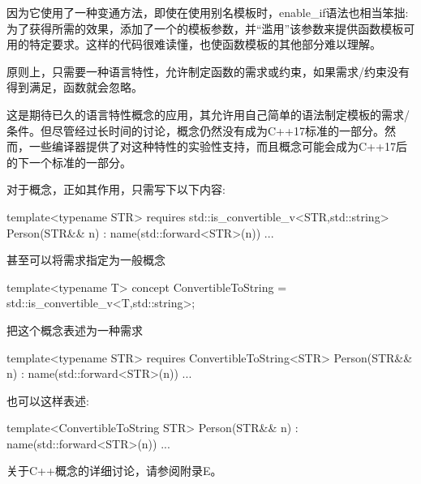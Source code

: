 因为它使用了一种变通方法，即使在使用别名模板时，enable\_if语法也相当笨拙:为了获得所需的效果，添加了一个的模板参数，并“滥用”该参数来提供函数模板可用的特定要求。这样的代码很难读懂，也使函数模板的其他部分难以理解。

原则上，只需要一种语言特性，允许制定函数的需求或约束，如果需求/约束没有得到满足，函数就会忽略。

这是期待已久的语言特性概念的应用，其允许用自己简单的语法制定模板的需求/条件。但尽管经过长时间的讨论，概念仍然没有成为C++17标准的一部分。然而，一些编译器提供了对这种特性的实验性支持，而且概念可能会成为C++17后的下一个标准的一部分。

对于概念，正如其作用，只需写下以下内容:

\begin{cpp}
template<typename STR>
requires std::is_convertible_v<STR,std::string>
Person(STR&& n) : name(std::forward<STR>(n)) {
	...
}
\end{cpp}

甚至可以将需求指定为一般概念

\begin{cpp}
template<typename T>
concept ConvertibleToString = std::is_convertible_v<T,std::string>;
\end{cpp}

把这个概念表述为一种需求

\begin{cpp}
template<typename STR>
requires ConvertibleToString<STR>
Person(STR&& n) : name(std::forward<STR>(n)) {
	...
}
\end{cpp}

也可以这样表述:

\begin{cpp}
template<ConvertibleToString STR>
Person(STR&& n) : name(std::forward<STR>(n)) {
	...
}
\end{cpp}

关于C++概念的详细讨论，请参阅附录E。




















